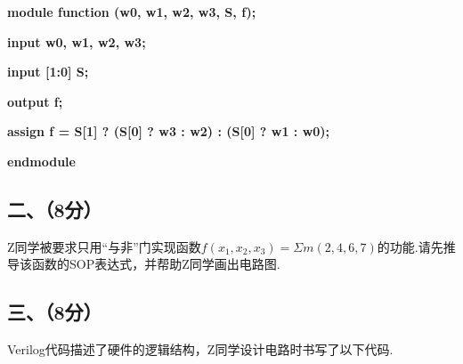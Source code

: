 \documentclass{ctexart}
\begin{document}
    \qquad \textbf{module function (w0, w1, w2, w3, S, f);}\par
    \qquad \qquad \textbf{input w0, w1, w2, w3;}\par
    \qquad \qquad \textbf{input [1:0] S;}\par
    \qquad \qquad \textbf{output f;}\par
    \qquad \qquad \textbf{assign f = S[1] ? (S[0] ? w3 : w2) : (S[0] ? w1 : w0);}		\par
    \qquad \textbf{endmodule }

\subsection*{二、（8分）}
Z同学被要求只用“与非”门实现函数$f(x_1,x_2,x_3)= \Sigma m(2,4,6,7)$的功能.请先推导该函数的SOP表达式，并帮助Z同学画出电路图.
\newpage
\subsection*{三、（8分）}
Verilog代码描述了硬件的逻辑结构，Z同学设计电路时书写了以下代码.\par
\end{document}
